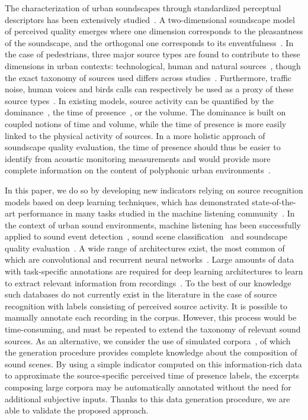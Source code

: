 \documentclass[twocolumn]{article}
\begin{document}
The characterization of urban soundscapes through standardized perceptual descriptors has been extensively studied~\cite{viollon2000, axelsson2010, cain2013, jeon2018, aletta2016}. A two-dimensional soundscape model of perceived quality emerges where one dimension corresponds to the pleasantness of the soundscape, and the orthogonal one corresponds to its enventfulness~\cite{axelsson2010, aumond2017, delaitre2014}. In the case of pedestrians, three major source types are found to contribute to these dimensions in urban contexts: technological, human and natural sources~\cite{nilsson2007, axelsson2010}, though the exact taxonomy of sources used differs across studies~\cite{guastavino2007, gygi2007, brown2011}. Furthermore, traffic noise, human voices and birds calls can respectively be used as a proxy of these source types~\cite{lavandier2006, ricciardi2014, aumond2017}. In existing models, source activity can be quantified by the dominance~\cite{hong2017, axelsson2010}, the time of presence~\cite{ricciardi2014}, or the volume. The dominance is built on coupled notions of time and volume, while the time of presence is more easily linked to the physical activity of sources. In a more holistic approach of soundscape quality evaluation, the time of presence should thus be easier to identify from acoustic monitoring measurements and would provide more complete information on the content of polyphonic urban environments~\cite{lavandier2016}.

In this paper, we do so by developing new indicators relying on source recognition models based on deep learning techniques, which has demonstrated state-of-the-art performance in many tasks studied in the machine listening community~\cite{mesaros2017}. In the context of urban sound environments, machine listening has been successfully applied to sound event detection~\cite{foggia2015, mcfee2018, adavanne2017, boes2018}, sound scene classification~\cite{torija2013, barchiesi2015, sun2019, valenti2016, salamon2017-2} and soundscape quality evaluation~\cite{lunden2016, yu2009, boes2018}. A wide range of architectures exist, the most common of which are convolutional and recurrent neural networks~\cite{mesaros2019}. Large amounts of data with task-specific annotations are required for deep learning architectures to learn to extract relevant information from recordings~\cite{salamon2014, mesaros2017, gemmeke2017}. To the best of our knowledge such databases do not currently exist in the literature in the case of source recognition with labels consisting of perceived source activity. It is possible to manually annotate each recording in the corpus. However, this process would be time-consuming, and must be repeated to extend the taxonomy of relevant sound sources. As an alternative, we consider the use of simulated corpora~\cite{lafay2016, salamon2017}, of which the generation procedure provides complete knowledge about the composition of sound scenes. By using a simple indicator computed on this information-rich data to approximate the source-specific perceived time of presence labels, the excerpts composing large corpora may be automatically annotated without the need for additional subjective inputs. Thanks to this data generation procedure, we are able to validate the proposed approach.
\end{document}
